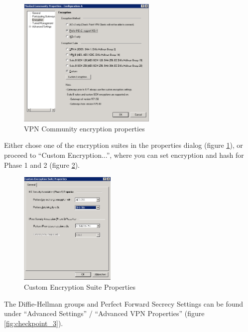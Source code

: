 \begin{figure}[p]
  \centering
  \includegraphics[width=0.592\textwidth]{img/checkpoint_1.png}
  \caption{VPN Community encryption properties}
  \label{fig:checkpoint_1}
\end{figure}

Either chose one of the encryption suites in the properties dialog
(figure \ref{fig:checkpoint_1}), or proceed to
``Custom Encryption...'', where you can set encryption and hash for
Phase 1 and 2 (figure \ref{fig:checkpoint_2}).

\begin{figure}[p]
  \centering
  \includegraphics[width=0.411\textwidth]{img/checkpoint_2.png}
  \caption{Custom Encryption Suite Properties}
  \label{fig:checkpoint_2}
\end{figure}

The Diffie-Hellman groups and Perfect Forward Secrecy Settings can be
found under ``Advanced Settings'' / ``Advanced VPN Properties''
(figure \ref{fig:checkpoint_3}).

